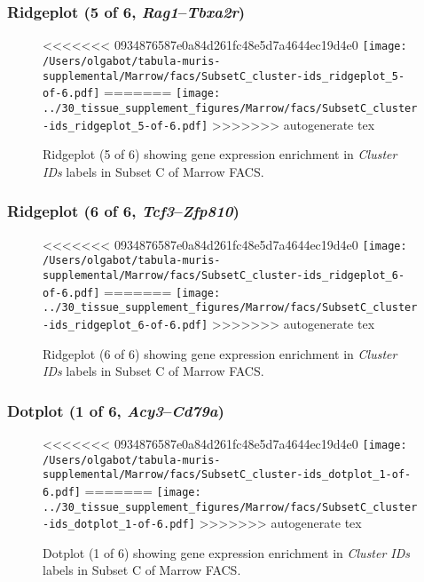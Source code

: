 \clearpage

\subsubsection{Ridgeplot (5 of 6, \emph{Rag1}--\emph{Tbxa2r})}
\begin{figure}[h]
\centering
<<<<<<< 0934876587e0a84d261fc48e5d7a4644ec19d4e0
\texttt{[image: /Users/olgabot/tabula-muris-supplemental/Marrow/facs/SubsetC\_cluster-ids\_ridgeplot\_5-of-6.pdf]}
=======
\texttt{[image: ../30\_tissue\_supplement\_figures/Marrow/facs/SubsetC\_cluster-ids\_ridgeplot\_5-of-6.pdf]}
>>>>>>> autogenerate tex

\caption{ Ridgeplot (5 of 6)  showing gene expression enrichment in \emph{Cluster IDs} labels in Subset C of Marrow FACS. }
\end{figure}


\clearpage

\subsubsection{Ridgeplot (6 of 6, \emph{Tcf3}--\emph{Zfp810})}
\begin{figure}[h]
\centering
<<<<<<< 0934876587e0a84d261fc48e5d7a4644ec19d4e0
\texttt{[image: /Users/olgabot/tabula-muris-supplemental/Marrow/facs/SubsetC\_cluster-ids\_ridgeplot\_6-of-6.pdf]}
=======
\texttt{[image: ../30\_tissue\_supplement\_figures/Marrow/facs/SubsetC\_cluster-ids\_ridgeplot\_6-of-6.pdf]}
>>>>>>> autogenerate tex

\caption{ Ridgeplot (6 of 6)  showing gene expression enrichment in \emph{Cluster IDs} labels in Subset C of Marrow FACS. }
\end{figure}


\clearpage

\subsubsection{Dotplot (1 of 6, \emph{Acy3}--\emph{Cd79a})}
\begin{figure}[h]
\centering
<<<<<<< 0934876587e0a84d261fc48e5d7a4644ec19d4e0
\texttt{[image: /Users/olgabot/tabula-muris-supplemental/Marrow/facs/SubsetC\_cluster-ids\_dotplot\_1-of-6.pdf]}
=======
\texttt{[image: ../30\_tissue\_supplement\_figures/Marrow/facs/SubsetC\_cluster-ids\_dotplot\_1-of-6.pdf]}
>>>>>>> autogenerate tex

\caption{ Dotplot (1 of 6)  showing gene expression enrichment in \emph{Cluster IDs} labels in Subset C of Marrow FACS. }
\end{figure}



